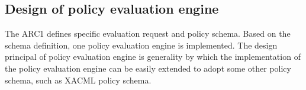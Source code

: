 \documentclass{article}                            %
\begin{document}
\subsection{Design of policy evaluation engine} %
\label{subsec:design_policyengine}

The ARC1 defines specific evaluation request and policy schema. Based on the schema definition, one policy evaluation engine is implemented. The design principal of policy evaluation engine is generality by which the implementation of the policy evaluation engine can be easily extended to adopt some other policy schema, such as XACML policy schema.

\begin{figure}[ht]
\end{figure}

\begin{figure}[ht]
\end{figure}
\end{document}

